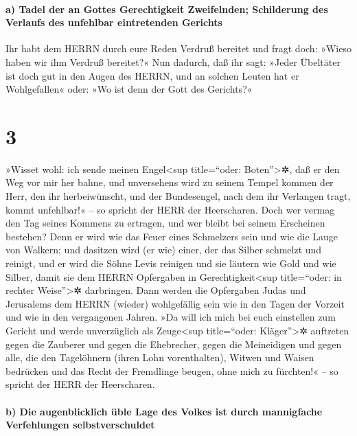 \hypertarget{a-tadel-der-an-gottes-gerechtigkeit-zweifelnden-schilderung-des-verlaufs-des-unfehlbar-eintretenden-gerichts}{%
\paragraph{a) Tadel der an Gottes Gerechtigkeit Zweifelnden; Schilderung
des Verlaufs des unfehlbar eintretenden
Gerichts}\label{a-tadel-der-an-gottes-gerechtigkeit-zweifelnden-schilderung-des-verlaufs-des-unfehlbar-eintretenden-gerichts}}

 Ihr habt dem HERRN durch eure Reden Verdruß bereitet und
fragt doch: »Wieso haben wir ihm Verdruß bereitet?« Nun dadurch, daß ihr
sagt: »Jeder Übeltäter ist doch gut in den Augen des HERRN, und an
solchen Leuten hat er Wohlgefallen« oder: »Wo ist denn der Gott des
Gerichts?«

\hypertarget{section-2}{%
\section{3}\label{section-2}}

 »Wisset wohl: ich sende meinen Engel\textless sup
title=``oder: Boten''\textgreater✲, daß er den Weg vor mir her bahne,
und unversehens wird zu seinem Tempel kommen der Herr, den ihr
herbeiwünscht, und der Bundesengel, nach dem ihr Verlangen tragt, kommt
unfehlbar!« -- so spricht der HERR der Heerscharen.  Doch
wer vermag den Tag seines Kommens zu ertragen, und wer bleibt bei seinem
Erscheinen bestehen? Denn er wird wie das Feuer eines Schmelzers sein
und wie die Lauge von Walkern;  und dasitzen wird (er wie)
einer, der das Silber schmelzt und reinigt, und er wird die Söhne Levis
reinigen und sie läutern wie Gold und wie Silber, damit sie dem HERRN
Opfergaben in Gerechtigkeit\textless sup title=``oder: in rechter
Weise''\textgreater✲ darbringen.  Dann werden die
Opfergaben Judas und Jerusalems dem HERRN (wieder) wohlgefällig sein wie
in den Tagen der Vorzeit und wie in den vergangenen Jahren.
 »Da will ich mich bei euch einstellen zum Gericht und
werde unverzüglich als Zeuge\textless sup title=``oder:
Kläger''\textgreater✲ auftreten gegen die Zauberer und gegen die
Ehebrecher, gegen die Meineidigen und gegen alle, die den Tagelöhnern
(ihren Lohn vorenthalten), Witwen und Waisen bedrücken und das Recht der
Fremdlinge beugen, ohne mich zu fürchten!« -- so spricht der HERR der
Heerscharen.

\hypertarget{b-die-augenblicklich-uxfcble-lage-des-volkes-ist-durch-mannigfache-verfehlungen-selbstverschuldet}{%
\paragraph{b) Die augenblicklich üble Lage des Volkes ist durch
mannigfache Verfehlungen
selbstverschuldet}\label{b-die-augenblicklich-uxfcble-lage-des-volkes-ist-durch-mannigfache-verfehlungen-selbstverschuldet}}

